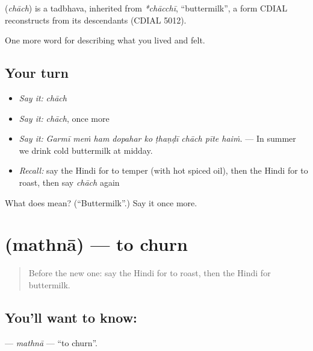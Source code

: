 \begin{cousinweb}
\textbf{} (\emph{chāch}) is a tadbhava, inherited from \emph{*chācchī}, \textquotedblleft{}buttermilk\textquotedblright{}, a form CDIAL reconstructs from its descendants (CDIAL 5012).
\end{cousinweb}

\begin{grammarlens}[title={What you've built}]
One more word for describing what you lived and felt.
\end{grammarlens}

\subsection*{Your turn}
\begin{itemize}
\raggedright
  \item \emph{Say it:} \emph{chāch}
  \item \emph{Say it:} \emph{chāch}, once more
  \item \emph{Say it:} \emph{Garmī meṁ ham dopahar ko ṭhaṇḍī chāch pīte haiṁ.} — In summer we drink cold buttermilk at midday.
  \item \emph{Recall:} say the Hindi for to temper (with hot spiced oil), then the Hindi for to roast, then say \emph{chāch} again
\end{itemize}

\begin{tcolorbox}[breakable,colback=teal!4,colframe=teal!35!black,title={Before you move on}]
What does  mean? (\textquotedblleft{}Buttermilk\textquotedblright{}.) Say it once more.
\end{tcolorbox}
\section[\texorpdfstring{\hi{मथना} (mathnā)}{मथना (mathnā)}]{ (mathnā) — to churn}

\label{lesson:HI-C522-mathna}



\begin{quote}
Before the new one: say the Hindi for to roast, then the Hindi for buttermilk.
\end{quote}

\subsection*{You'll want to know: }
\textbf{} — \emph{mathnā} — \textquotedblleft{}to churn\textquotedblright{}.

